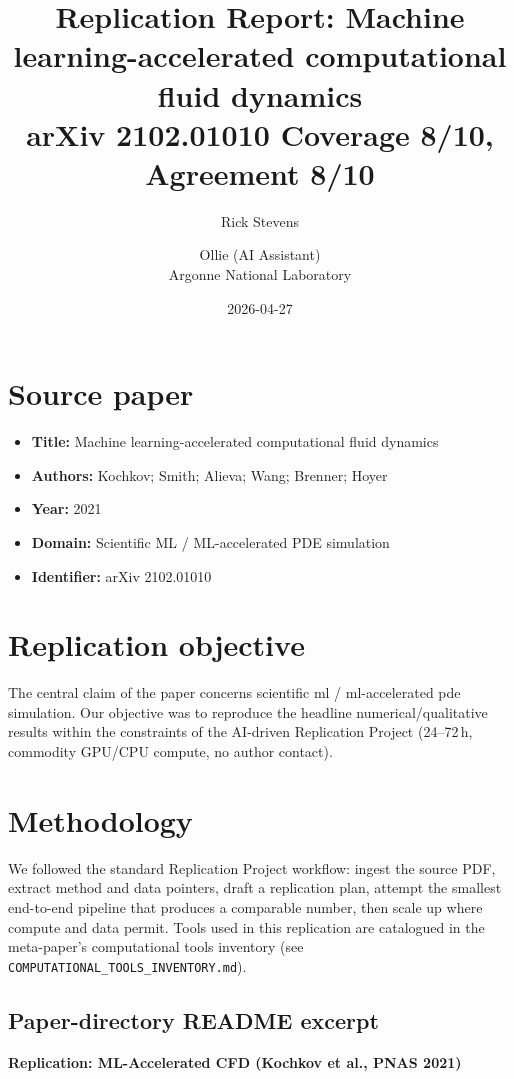 \documentclass[11pt]{article}
\title{Replication Report: Machine learning-accelerated computational fluid dynamics\\[2pt]\large arXiv 2102.01010 \textbar{} Coverage 8/10, Agreement 8/10}
\author{Rick Stevens \and Ollie (AI Assistant)\\\small Argonne National Laboratory}
\date{2026-04-27}
\begin{document}
\maketitle

\section{Source paper}
\begin{itemize}
\item \textbf{Title:} Machine learning-accelerated computational fluid dynamics
\item \textbf{Authors:} Kochkov; Smith; Alieva; Wang; Brenner; Hoyer
\item \textbf{Year:} 2021
\item \textbf{Domain:} Scientific ML / ML-accelerated PDE simulation
\item \textbf{Identifier:} arXiv 2102.01010
\end{itemize}


\section{Replication objective}
The central claim of the paper concerns scientific ml / ml-accelerated pde simulation. Our objective was to reproduce the headline numerical/qualitative results within the constraints of the AI-driven Replication Project (24--72\,h, commodity GPU/CPU compute, no author contact). 

\section{Methodology}
We followed the standard Replication Project workflow: ingest the source PDF, extract method and data pointers, draft a replication plan, attempt the smallest end-to-end pipeline that produces a comparable number, then scale up where compute and data permit. Tools used in this replication are catalogued in the meta-paper's computational tools inventory (see \texttt{COMPUTATIONAL\_TOOLS\_INVENTORY.md}).



\subsection*{Paper-directory README excerpt}
\small
\par\medskip\textbf{Replication: ML-Accelerated CFD (Kochkov et al., PNAS 2021)}\par
\end{document}
